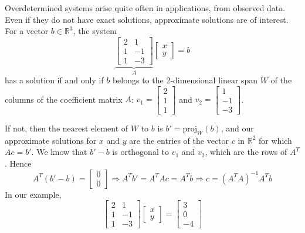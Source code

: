 \documentclass[a4paper, 9pt]{extarticle}
\begin{document}
Overdetermined systems arise quite often in applications, from observed data.
Even if they do not have exact solutions, approximate solutions are of interest. \\[2ex]
For a vector $b \in \mathbb{R}^3$, the system
$$
  \underbrace{
    \begin{bmatrix}
      2 & 1  \\
      1 & -1 \\
      1 & -3
    \end{bmatrix}
  }_{A}
  \begin{bmatrix}
    x \\
    y
  \end{bmatrix}
  = b
$$
has a solution if and only if $b$ belongs to the 2-dimensional linear span $W$
of the columns of the coefficient matrix $A$:
$v_1 = \begin{bmatrix} 2 \\ 1 \\ 1 \end{bmatrix}$ and $v_2 = \begin{bmatrix} 1 \\ -1 \\ -3 \end{bmatrix}$.

If not, then the nearest element of $W$ to $b$ is $b' = \text{proj}_W(b)$, and our approximate solutions for $x$ and $y$ are the entries of the vector $c$ in $\mathbb{R}^2$
for which $Ac = b'$. We know that $b' - b$ is orthogonal to $v_1$ and $v_2$, which are the rows of $A^T$. Hence
$$
  A^T(b' - b) =
  \begin{bmatrix}
    0 \\
    0
  \end{bmatrix}
  \Longrightarrow A^T b' = A^T A c = A^T b \Longrightarrow
  c = (A^T A)^{-1} A^T b
$$
In our example,
$$
  \begin{bmatrix}
    2 & 1  \\
    1 & -1 \\
    1 & -3
  \end{bmatrix}
  \begin{bmatrix}
    x \\
    y
  \end{bmatrix}
  =
  \begin{bmatrix}
    3 \\
    0 \\
    -4
  \end{bmatrix}
$$
\end{document}
